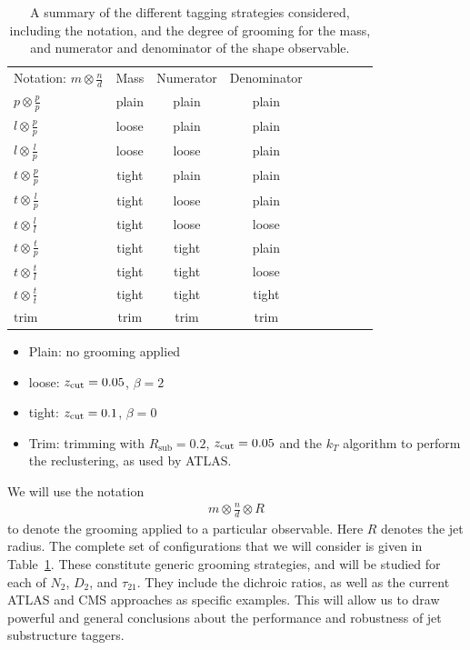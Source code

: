 \documentclass[11pt,letterpaper]{article}
\DeclareRobustCommand{\Tab}[1]{Table~\ref{#1}}
\newcommand{\zcut}{z_{\rm cut}}
\begin{document}
\begin{table}[t!]
\begin{center}
\begin{tabular}{| l | c | c |c |c|c|c |c|r| }
  \hline                       
  Notation: $m \otimes \frac{n}{d}$ & Mass & Numerator & Denominator \\
  $p \otimes \frac{p}{p}$ & plain  &  plain & plain \\
  $l \otimes \frac{p}{p}$ & loose  &  plain & plain \\
  $l \otimes \frac{l}{p}$ & loose  &  loose & plain \\
  $t \otimes \frac{p}{p}$ & tight  &  plain & plain \\
  $t \otimes \frac{l}{p}$ & tight  &  loose & plain \\
  $t \otimes \frac{l}{l}$ & tight  &  loose & loose \\
  $t \otimes \frac{t}{p}$ & tight  &  tight & plain \\
  $t \otimes \frac{t}{l}$ & tight  &  tight & loose \\
  $t \otimes \frac{t}{t}$ & tight  &  tight & tight \\
  $\text{trim}$ & trim &  trim & trim \\
  \hline  
\end{tabular}
\end{center}
\caption{
A summary of the different tagging strategies considered, including the notation, and the degree of grooming for the mass, and numerator and denominator of the shape observable.
}
\label{tab:tag_summary}
\end{table}


\begin{itemize}
\item Plain: no grooming applied
\item loose: $\zcut=0.05$, $\beta=2$
\item tight: $\zcut=0.1$, $\beta=0$
\item Trim: trimming with $R_{\text{sub}}=0.2$,  $ \zcut=0.05$ and the $k_T$ algorithm to perform the reclustering, as used by ATLAS.
\end{itemize}
We will use the notation 
\begin{align}
m \otimes \frac{n}{d} \otimes R
\end{align}
to denote the grooming applied to a particular observable. Here $R$ denotes the jet radius. The complete set of configurations that we will consider is given in \Tab{tab:tag_summary}. These constitute generic grooming strategies, and will be studied for each of $N_2$, $D_2$, and $\tau_{21}$. They include the dichroic ratios, as well as the current ATLAS and CMS approaches as specific examples.  This will allow us to draw powerful and general conclusions about the performance and robustness of jet substructure taggers.
\end{document}
